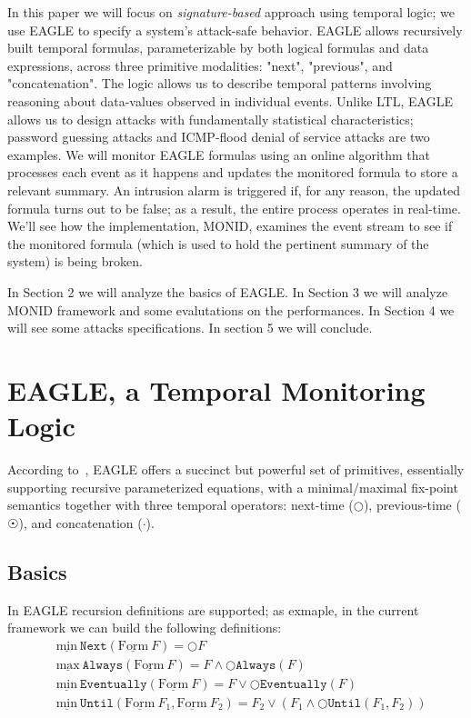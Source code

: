 \documentclass[english]{article}
\begin{document}
In this paper we will focus on \textit{signature-based} approach using temporal logic; we use EAGLE\cite{barringer2004rule,barringer2003eagle} to specify a system's attack-safe behavior. EAGLE allows recursively built temporal formulas, parameterizable by both logical formulas and data expressions, across three primitive modalities: "next", "previous", and "concatenation". The logic allows us to describe temporal patterns involving reasoning about data-values observed in individual events. Unlike LTL, EAGLE allows us to design attacks with fundamentally statistical characteristics; password guessing attacks and ICMP-flood denial of service attacks are two examples. We will monitor EAGLE formulas using an online algorithm that processes each event as it happens and updates the monitored formula to store a relevant summary. An intrusion alarm is triggered if, for any reason, the updated formula turns out to be false; as a result, the entire process operates in real-time. We'll see how the implementation, MONID, examines the event stream to see if the monitored formula (which is used to hold the pertinent summary of the system) is being broken.


In Section 2 we will analyze the basics of EAGLE. In Section 3 we will analyze MONID framework and some evalutations on the performances. In Section 4 we will see some attacks specifications. In section 5 we will conclude.

\section{EAGLE, a Temporal Monitoring Logic}
According to~\cite{barringer2004program}, EAGLE offers a succinct but powerful set of primitives, essentially supporting recursive parameterized equations, with a minimal/maximal fix-point semantics together with three temporal operators: next-time ($\bigcirc$), previous-time ($\astrosun$), and concatenation ($\cdot$).
\subsection{Basics}\label{sec:ltl}
In EAGLE recursion definitions are supported; as exmaple, in the current framework we can build the following definitions:
\begin{align*}
& \underline{\text{min}}\ \mathtt{Next}(\underline{\text{Form}}\ F) = \bigcirc F \\
& \underline{\text{max}}\ \mathtt{Always}(\underline{\text{Form}}\ F) = F \land \bigcirc \mathtt{Always}(F) \\
& \underline{\text{min}}\ \mathtt{Eventually}(\underline{\text{Form}}\ F) = F \lor \bigcirc \mathtt{Eventually}(F) \\
& \underline{\text{min}}\ \mathtt{Until}(\underline{\text{Form}}\ F_1, \underline{\text{Form}}\ F_2) = F_2 \lor (F_1 \land \bigcirc \mathtt{Until}(F_1,F_2))
\end{align*}
\end{document}
